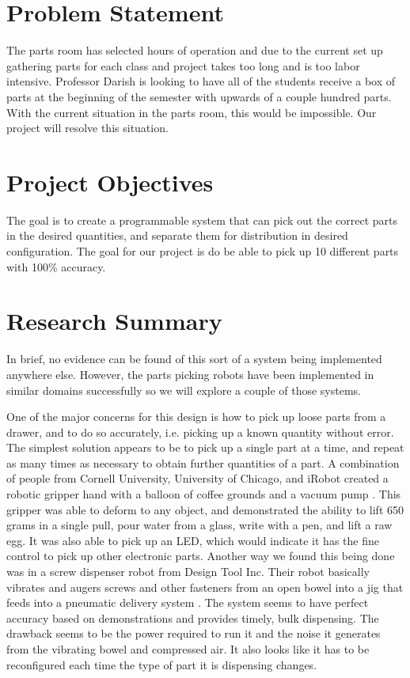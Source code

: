 \documentclass[12pt]{report}
\begin{document}
\section*{Problem Statement}

The parts room has selected hours of operation and due to the current set up gathering parts for each class and project takes too long and is too labor intensive. Professor Darish is looking to have all of the students receive a box of parts at the beginning of the semester with upwards of a couple hundred parts. With the current situation in the parts room, this would be impossible. Our project will resolve this situation. 

\section*{Project Objectives}

The goal is to create a programmable system that can pick out the correct parts in the desired quantities, and separate them for distribution in desired configuration.  The goal for our project is do be able to pick up 10 different parts with 100\% accuracy. 

\section*{Research Summary}
In brief, no evidence can be found of this sort of a system being implemented anywhere else. However, the parts picking robots have been implemented in similar domains successfully so we will explore a couple of those systems. 
	
	
One of the major concerns for this design is how to pick up loose parts from a drawer, and to do so accurately, i.e. picking up a known quantity without error.  The simplest solution appears to be to pick up a single part at a time, and repeat as many times as necessary to obtain further quantities of a part.  A combination of people from Cornell University, University of Chicago, and iRobot created a robotic gripper hand with a balloon of coffee grounds and a vacuum pump \cite{universalGrabber}.  This gripper was able to deform to any object, and demonstrated the ability to lift 650 grams in a single pull, pour water from a glass, write with a pen, and lift a raw egg.  It was also able to pick up an LED, which would indicate it has the fine control to pick up other electronic parts.  Another way we found this being done was in a screw dispenser robot from Design Tool Inc. Their robot basically vibrates and augers screws and other fasteners from an open bowel into a jig that feeds into a pneumatic delivery system \cite{screwDispenser}. The system seems to have perfect accuracy based on demonstrations and provides timely, bulk dispensing. The drawback seems to be the power required to run it and the noise it generates from the vibrating bowel and compressed air. It also looks like it has to be reconfigured each time the type of part it is dispensing changes.
\end{document}
